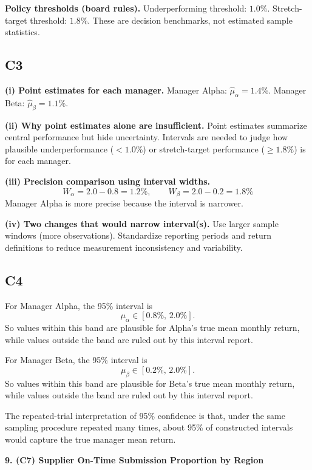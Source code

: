 \begin{ExamProblems}
		\textbf{Policy thresholds (board rules).}
		Underperforming threshold: $1.0\%$.
		Stretch-target threshold: $1.8\%$.
		These are decision benchmarks, not estimated sample statistics.
		
		\subsection*{C3}
		\textbf{(i) Point estimates for each manager.}
		Manager Alpha: $\hat{\mu}_\alpha=1.4\%$.
		Manager Beta: $\hat{\mu}_\beta=1.1\%$.
		
		\textbf{(ii) Why point estimates alone are insufficient.}
		Point estimates summarize central performance but hide uncertainty.
		Intervals are needed to judge how plausible underperformance ($<1.0\%$) or stretch-target performance ($\ge1.8\%$) is for each manager.
		
		\textbf{(iii) Precision comparison using interval widths.}
		\[
		W_{\alpha}=2.0-0.8=1.2\%,\qquad W_{\beta}=2.0-0.2=1.8\%
		\]
		Manager Alpha is more precise because the interval is narrower.
		
		\textbf{(iv) Two changes that would narrow interval(s).}
		Use larger sample windows (more observations).
		Standardize reporting periods and return definitions to reduce measurement inconsistency and variability.
		
		\subsection*{C4}
		For Manager Alpha, the 95\% interval is
		\[
		\mu_\alpha\in[0.8\%,\,2.0\%].
		\]
		So values within this band are plausible for Alpha's true mean monthly return, while values outside the band are ruled out by this interval report.
		
		For Manager Beta, the 95\% interval is
		\[
		\mu_\beta\in[0.2\%,\,2.0\%].
		\]
		So values within this band are plausible for Beta's true mean monthly return, while values outside the band are ruled out by this interval report.
		
		The repeated-trial interpretation of 95\% confidence is that, under the same sampling procedure repeated many times, about 95\% of constructed intervals would capture the true manager mean return.
		
		\newpage
		\item
		\textbf{9. (C7) Supplier On-Time Submission Proportion by Region}
		

\end{ExamProblems}
